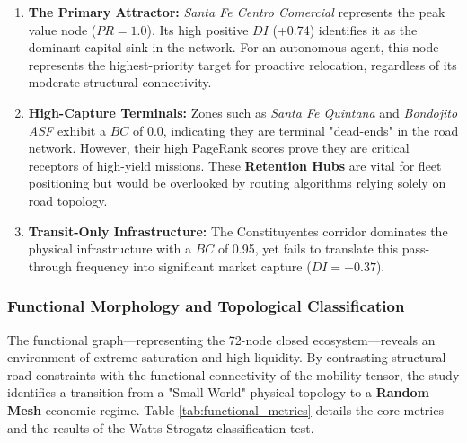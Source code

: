 \begin{enumerate}[noitemsep, topsep=3pt]
    \item \textbf{The Primary Attractor:} \textit{Santa Fe Centro Comercial} represents the peak value node ($PR=1.0$). Its high positive $DI$ (+0.74) identifies it as the dominant capital sink in the network. For an autonomous agent, this node represents the highest-priority target for proactive relocation, regardless of its moderate structural connectivity.
    
    \item \textbf{High-Capture Terminals:} Zones such as \textit{Santa Fe Quintana} and \textit{Bondojito ASF} exhibit a $BC$ of 0.0, indicating they are terminal "dead-ends" in the road network. However, their high PageRank scores prove they are critical receptors of high-yield missions. These \textbf{Retention Hubs} are vital for fleet positioning but would be overlooked by routing algorithms relying solely on road topology.
    
    \item \textbf{Transit-Only Infrastructure:} The Constituyentes corridor dominates the physical infrastructure with a $BC$ of 0.95, yet fails to translate this pass-through frequency into significant market capture ($DI = -0.37$). 
\end{enumerate}



\subsubsection{Functional Morphology and Topological Classification}

The functional graph—representing the 72-node closed ecosystem—reveals an environment of extreme saturation and high liquidity. By contrasting structural road constraints with the functional connectivity of the mobility tensor, the study identifies a transition from a "Small-World" physical topology to a \textbf{Random Mesh} economic regime. Table \ref{tab:functional_metrics} details the core metrics and the results of the Watts-Strogatz classification test.

